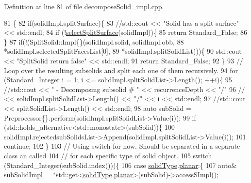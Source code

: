 Definition at line 81 of file decompose\+Solid\+\_\+impl.\+cpp.


\begin{DoxyCode}
81                                                                          \{
82     \textcolor{keywordflow}{if}(solidImpl.splitSurface)\{
83         \textcolor{comment}{//std::cout << "Solid has a split surface" << std::endl;}
84         \textcolor{keywordflow}{if} (!\hyperlink{classMcCAD_1_1Decomposition_1_1DecomposeSolid_1_1Impl_a99e2391d75cc9f871a0cb9f984b67e24}{selectSplitSurface}(solidImpl))\{
85             \textcolor{keywordflow}{return} Standard\_False;
86         \}
87         \textcolor{keywordflow}{if}(!(SplitSolid::Impl\{\}(solidImpl.solid, solidImpl.obb,
88                                 *solidImpl.selectedSplitFacesList[0],
89                                 *solidImpl.splitSolidList)))\{
90             std::cout << \textcolor{stringliteral}{"SplitSolid return false"} << std::endl;
91             \textcolor{keywordflow}{return} Standard\_False;
92         \}
93         \textcolor{comment}{// Loop over the resulting subsolids and split each one of them recursively.}
94         \textcolor{keywordflow}{for} (Standard\_Integer i = 1; i <= solidImpl.splitSolidList->Length(); ++i)\{
95             \textcolor{comment}{//std::cout << "   - Decomposing subsolid # " << recurrenceDepth << "/"}
96             \textcolor{comment}{//          << solidImpl.splitSolidList->Length() << "/" << i << std::endl;}
97             \textcolor{comment}{//std::cout << splitSolidList->Length() << std::endl;}
98             \textcolor{keyword}{auto} subSolid = Preprocessor\{\}.perform(solidImpl.splitSolidList->Value(i));
99             \textcolor{keywordflow}{if} (std::holds\_alternative<std::monostate>(subSolid))\{
100                 solidImpl.rejectedsubSolidsList->Append(solidImpl.splitSolidList->Value(i));
101                 \textcolor{keywordflow}{continue};
102             \}
103             \textcolor{comment}{// Using switch for now. Should be separated in a separate class an called}
104             \textcolor{comment}{// for each specific type of solid object.}
105             \textcolor{keywordflow}{switch} (Standard\_Integer(subSolid.index()))\{
106             \textcolor{keywordflow}{case} \hyperlink{classMcCAD_1_1Decomposition_1_1DecomposeSolid_1_1Impl_ad808642e410eb4b8fa0d42b9a8ca3715}{solidType}.\hyperlink{classMcCAD_1_1Tools_1_1SolidType_a69c62abbe9fa709ccbaf47d4daf356e1a03cc49496c89d07ea5f8ef75c4912243}{planar}:\{
107                 \textcolor{keyword}{auto}& subSolidImpl = *std::get<\hyperlink{classMcCAD_1_1Decomposition_1_1DecomposeSolid_1_1Impl_ad808642e410eb4b8fa0d42b9a8ca3715}{solidType}.\hyperlink{classMcCAD_1_1Tools_1_1SolidType_a69c62abbe9fa709ccbaf47d4daf356e1a03cc49496c89d07ea5f8ef75c4912243}{planar}>(subSolid)->accessSImpl();

\end{DoxyCode}
